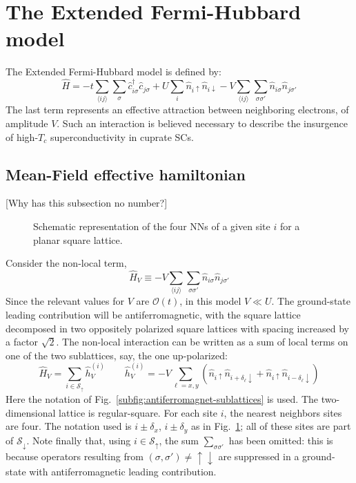 \section{The Extended Fermi-Hubbard model}

The Extended Fermi-Hubbard model is defined by:
\begin{equation}\label{eq:extended-hubbard-model}
	\hat H =
	-t \sum_{\langle ij \rangle} \sum_\sigma \hat c_{i\sigma}^\dagger \hat c_{j\sigma}
	+ U \sum_i \hat n_{i\uparrow} \hat n_{i\downarrow}
	- V \sum_{\langle ij \rangle} \sum_{\sigma \sigma'} \hat n_{i\sigma} \hat n_{j\sigma'}
\end{equation}
The last term represents an effective attraction between neighboring electrons, of amplitude $V$. Such an interaction is believed \cite{cao2025p-wave} necessary to describe the insurgence of high-$T_c$ superconductivity in cuprate SCs. \todo

\subsection{Mean-Field effective hamiltonian}

{\color{tabred}[Why has this subsection no number?]}

\begin{figure}
	\centering
	
	\caption{Schematic representation of the four NNs of a given site $i$ for a planar square lattice.}
	\label{fig:square-nearest-neighbors}
\end{figure}

Consider the non-local term,
\[
	\hat H_V \equiv - V \sum_{\langle ij \rangle} \sum_{\sigma \sigma'} \hat n_{i\sigma} \hat n_{j\sigma'}
\]
{\color{tabred}Since the relevant values for $V$ are $\mathcal{O}(t)$, in this model $V \ll U$.} The ground-state leading contribution will be antiferromagnetic, with the square lattice decomposed in two oppositely polarized square lattices with spacing increased by a factor $\sqrt{2}$. The non-local interaction can be written as a sum of local terms on one of the two sublattices, say, the one up-polarized:
\[
	\hat H_V = \sum_{i \in \mathcal{S}_\uparrow} \hat h_V^{(i)}
	\qquad
	\hat h_V^{(i)} = -V \sum_{\ell = x,y} \left(
		\hat n_{i\uparrow} \hat n_{i + \delta_\ell \downarrow} + \hat n_{i\uparrow} \hat n_{i - \delta_\ell \downarrow} 
	\right) 
\]
Here the notation of Fig.~\ref{subfig:antiferromagnet-sublattices} is used. The two-dimensional lattice is regular-square. For each site $i$, the nearest neighbors sites are four. The notation used is $i \pm \delta_x$, $i \pm  \delta_y$ as in Fig.~\ref{fig:square-nearest-neighbors}; all of these sites are part of $\mathcal{S}_\downarrow$. Note finally that, using $i \in \mathcal{S}_\uparrow$, the sum $\sum_{\sigma \sigma'}$ has been omitted: this is because operators resulting from $(\sigma, \sigma') \neq \uparrow\downarrow$ are suppressed in a ground-state with antiferromagnetic leading contribution.

